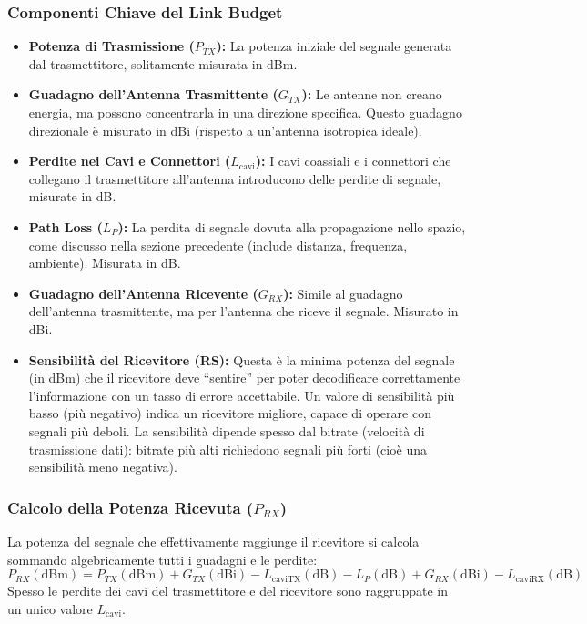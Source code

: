 \subsubsection{Componenti Chiave del Link Budget}
\begin{itemize}
    \item \textbf{Potenza di Trasmissione ($P_{TX}$):} La potenza iniziale del segnale generata dal trasmettitore, solitamente misurata in dBm.
    \item \textbf{Guadagno dell'Antenna Trasmittente ($G_{TX}$):} Le antenne non creano energia, ma possono concentrarla in una direzione specifica. Questo guadagno direzionale è misurato in dBi (rispetto a un'antenna isotropica ideale).
    \item \textbf{Perdite nei Cavi e Connettori ($L_{\text{cavi}}$):} I cavi coassiali e i connettori che collegano il trasmettitore all'antenna introducono delle perdite di segnale, misurate in dB.
    \item \textbf{Path Loss ($L_P$):} La perdita di segnale dovuta alla propagazione nello spazio, come discusso nella sezione precedente (include distanza, frequenza, ambiente). Misurata in dB.
    \item \textbf{Guadagno dell'Antenna Ricevente ($G_{RX}$):} Simile al guadagno dell'antenna trasmittente, ma per l'antenna che riceve il segnale. Misurato in dBi.
    \item \textbf{Sensibilità del Ricevitore (RS):} Questa è la minima potenza del segnale (in dBm) che il ricevitore deve ``sentire'' per poter decodificare correttamente l'informazione con un tasso di errore accettabile. Un valore di sensibilità più basso (più negativo) indica un ricevitore migliore, capace di operare con segnali più deboli. La sensibilità dipende spesso dal bitrate (velocità di trasmissione dati): bitrate più alti richiedono segnali più forti (cioè una sensibilità meno negativa).
\end{itemize}

\subsubsection{Calcolo della Potenza Ricevuta ($P_{RX}$)}
La potenza del segnale che effettivamente raggiunge il ricevitore si calcola sommando algebricamente tutti i guadagni e le perdite:
\[ P_{RX} (\text{dBm}) = P_{TX} (\text{dBm}) + G_{TX} (\text{dBi}) - L_{\text{caviTX}} (\text{dB}) - L_P (\text{dB}) + G_{RX} (\text{dBi}) - L_{\text{caviRX}} (\text{dB}) \]
Spesso le perdite dei cavi del trasmettitore e del ricevitore sono raggruppate in un unico valore $L_{\text{cavi}}$.

